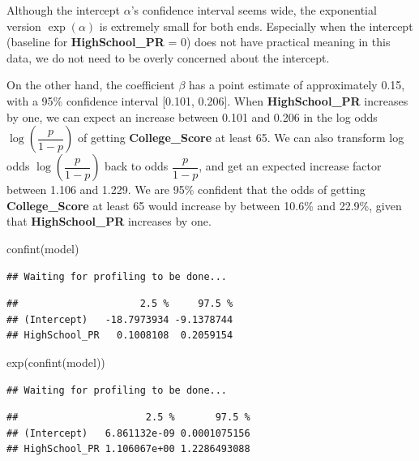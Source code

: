 \documentclass[
]{article}
\newenvironment{Shaded}{\begin{snugshade}}{\end{snugshade}}
\newcommand{\FunctionTok}[1]{\textcolor[rgb]{0.00,0.00,0.00}{#1}}
\newcommand{\NormalTok}[1]{#1}
\begin{document}
Although the intercept \(\alpha\)'s confidence interval seems wide, the
exponential version \(\exp(\alpha)\) is extremely small for both ends.
Especially when the intercept (baseline for \textbf{HighSchool\_PR} = 0)
does not have practical meaning in this data, we do not need to be
overly concerned about the intercept.

On the other hand, the coefficient \(\beta\) has a point estimate of
approximately 0.15, with a 95\% confidence interval {[}0.101, 0.206{]}.
When \textbf{HighSchool\_PR} increases by one, we can expect an increase
between 0.101 and 0.206 in the log odds \(\log (\dfrac{p}{1-p})\) of
getting \textbf{College\_Score} at least 65. We can also transform log
odds \(\log (\dfrac{p}{1-p})\) back to odds \(\dfrac{p}{1-p}\), and get
an expected increase factor between 1.106 and 1.229. We are 95\%
confident that the odds of getting \textbf{College\_Score} at least 65
would increase by between 10.6\% and 22.9\%, given that
\textbf{HighSchool\_PR} increases by one.

\begin{Shaded}
\begin{Highlighting}[]
\FunctionTok{confint}\NormalTok{(model)}
\end{Highlighting}
\end{Shaded}

\begin{verbatim}
## Waiting for profiling to be done...
\end{verbatim}

\begin{verbatim}
##                     2.5 %     97.5 %
## (Intercept)   -18.7973934 -9.1378744
## HighSchool_PR   0.1008108  0.2059154
\end{verbatim}

\begin{Shaded}
\begin{Highlighting}[]
\FunctionTok{exp}\NormalTok{(}\FunctionTok{confint}\NormalTok{(model))}
\end{Highlighting}
\end{Shaded}

\begin{verbatim}
## Waiting for profiling to be done...
\end{verbatim}

\begin{verbatim}
##                      2.5 %       97.5 %
## (Intercept)   6.861132e-09 0.0001075156
## HighSchool_PR 1.106067e+00 1.2286493088
\end{verbatim}
\end{document}
